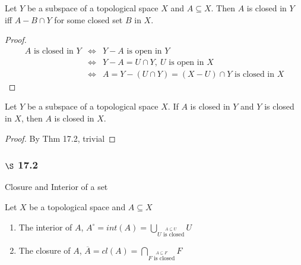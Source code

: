 \begin{thm*}[17.2]
	Let $Y$ be a subspace of a topological space $X$ and $A \subseteq X$. Then $A$ is closed in $Y$ iff $A - B \cap Y$ for some closed set $B$ in $X$.
\end{thm*}

\begin{proof}
	\begin{eqnarray*}
		A \text{ is closed in }Y &\Leftrightarrow & Y-A \text{ is open in } Y\\
		&\Leftrightarrow& Y - A = U \cap Y, ~ U \text{ is open in }X\\
		&\Leftrightarrow& A = Y-(U \cap Y) = (X - U) \cap Y \text{ is closed in } X
	\end{eqnarray*}
\end{proof}

\begin{thm*}
	Let $Y$ be a subspace of a topological space $X$. If $A$ is closed in $Y$ and $Y$ is closed in $X$, then $A$ is closed in $X$.
\end{thm*}

\begin{proof}
	By Thm 17.2, trivial
\end{proof}

\subsubsection*{$\S$ 17.2}Closure and Interior of a set

\begin{defn}
	Let $X$ be a topological space and $A \subseteq X$
	
	\begin{enumerate}
		\item The interior of $A$, $A^{\circ} = int(A) = \bigcup_{\stackrel{A \subseteq U}{U \text{ is closed}}}U$
		\item The closure of $A$, $\overline{A} = cl(A) = \bigcap_{\stackrel{A \subseteq F}{F \text{ is closed}}}F$
	\end{enumerate}
\end{defn}

